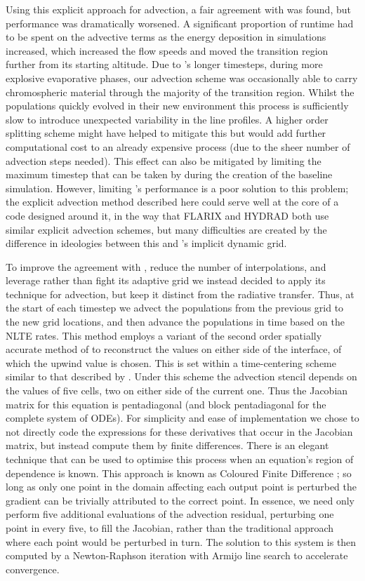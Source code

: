 Using this explicit approach for advection, a fair agreement with \Radyn{} was found, but performance was dramatically worsened.
A significant proportion of runtime had to be spent on the advective terms as the energy deposition in simulations increased, which increased the flow speeds and moved the transition region further from its starting altitude.
Due to \Radyn{}'s longer timesteps, during more explosive evaporative phases, our advection scheme was occasionally able to carry chromospheric material through the majority of the transition region.
Whilst the populations quickly evolved in their new environment this process is sufficiently slow to introduce unexpected variability in the line profiles.
A higher order splitting scheme might have helped to mitigate this but would add further computational cost to an already expensive process (due to the sheer number of advection steps needed).
This effect can also be mitigated by limiting the maximum timestep that can be taken by \Radyn{} during the creation of the baseline simulation.
However, limiting \Radyn{}'s performance is a poor solution to this problem; the explicit advection method described here could serve well at the core of a code designed around it, in the way that FLARIX and HYDRAD both use similar explicit advection schemes, but many difficulties are created by the difference in ideologies between this and \Radyn{}'s implicit dynamic grid.

To improve the agreement with \Radyn{}, reduce the number of interpolations, and leverage rather than fight its adaptive grid we instead decided to apply its technique for advection, but keep it distinct from the radiative transfer.
Thus, at the start of each timestep we advect the populations from the previous grid to the new grid locations, and then advance the populations in time based on the NLTE rates.
This method employs a variant of the second order spatially accurate method of \citet{VanLeer1979} to reconstruct the values on either side of the interface, of which the upwind value is chosen.
This is set within a time-centering scheme similar to that described by \citet{Dorfi1997}.
Under this scheme the advection stencil depends on the values of five cells, two on either side of the current one.
Thus the Jacobian matrix for this equation is pentadiagonal (and block pentadiagonal for the complete system of ODEs).
For simplicity and ease of implementation we chose to not directly code the expressions for these derivatives that occur in the Jacobian matrix, but instead compute them by finite differences.
There is an elegant technique that can be used to optimise this process when an equation's region of dependence is known.
This approach is known as Coloured Finite Difference \citep{Curtis1974}; so long as only one point in the domain affecting each output point is perturbed the gradient can be trivially attributed to the correct point.
In essence, we need only perform five additional evaluations of the advection residual, perturbing one point in every five, to fill the Jacobian, rather than the traditional approach where each point would be perturbed in turn.
The solution to this system is then computed by a Newton-Raphson iteration with Armijo line search \citep{Armijo1966} to accelerate convergence.

